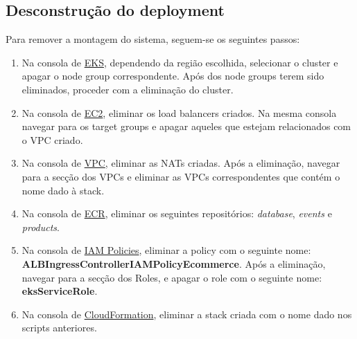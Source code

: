 \documentclass[11pt,a4paper]{article}
\begin{document}
\subsection{Desconstrução do deployment}
Para remover a montagem do sistema, seguem-se os seguintes passos:
\begin{enumerate}
	\item Na consola de \href{https://eu-west-1.console.aws.amazon.com/eks/home?region=eu-west-1#/clusters}{EKS}, dependendo da região escolhida, selecionar o cluster e apagar o node group correspondente. Após dos node groups terem sido eliminados, proceder com a eliminação do cluster.
	\item Na consola de \href{https://eu-west-1.console.aws.amazon.com/ec2/v2/home?region=eu-west-1#LoadBalancers}{EC2}, eliminar os load balancers criados. Na mesma consola navegar para os target groups e apagar aqueles que estejam relacionados com o VPC criado.
	\item Na consola de \href{https://eu-west-1.console.aws.amazon.com/vpc/home?region=eu-west-1#NatGateways}{VPC}, eliminar as NATs criadas. Após a eliminação, navegar para a secção dos VPCs e eliminar as VPCs correspondentes que contém o nome dado à stack.
	\item Na consola de \href{https://console.aws.amazon.com/ecr/repositories?region=us-east-1}{ECR}, eliminar os seguintes repositórios: \textit{database}, \textit{events} e \textit{products}.
	\item Na consola de \href{https://console.aws.amazon.com/iam/home?#/policies}{IAM Policies}, eliminar a policy com o seguinte nome: \textbf{ALBIngressControllerIAMPolicyEcommerce}. Após a eliminação, navegar para a secção dos Roles, e apagar o role com o seguinte nome: \textbf{eksServiceRole}.
	\item Na consola de \href{https://eu-west-1.console.aws.amazon.com/cloudformation/home?region=eu-west-1#/stacks}{CloudFormation}, eliminar a stack criada com o nome dado nos scripts anteriores.
\end{enumerate}
\end{document}
